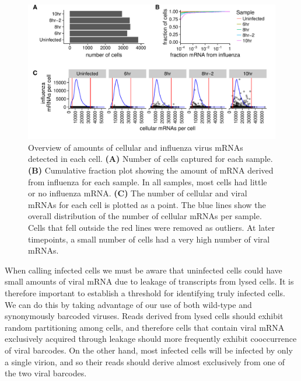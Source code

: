 \documentclass[9pt,lineno]{elife}
\begin{document}
\begin{figure}
\includegraphics[width=\linewidth]{figures/p_cell_mRNA_summary.pdf}
\caption{\label{fig:cells}
Overview of amounts of cellular and influenza virus mRNAs detected in each cell.
{\bf (A)} 
Number of cells captured for each sample.
{\bf (B)} 
Cumulative fraction plot showing the amount of mRNA derived from influenza for each sample.
In all samples, most cells had little or no influenza mRNA.
{\bf (C)} 
The number of cellular and viral mRNAs for each cell is plotted as a point.
The blue lines show the overall distribution of the number of cellular mRNAs per sample.
Cells that fell outside the red lines were removed as outliers.
At later timepoints, a small number of cells had a very high number of viral mRNAs.
}
\end{figure}

When calling infected cells we must be aware that uninfected cells could have small amounts of viral mRNA due to leakage of transcripts from lysed cells.
It is therefore important to establish a threshold for identifying truly infected cells.
We can do this by taking advantage of our use of both wild-type and synonymously barcoded viruses.
Reads derived from lysed cells should exhibit random partitioning among cells, and therefore cells that contain viral mRNA exclusively acquired  through leakage should more frequently exhibit cooccurrence of viral barcodes.
On the other hand, most infected cells will be infected by only a single virion, and so their reads should derive almost exclusively from one of the two viral barcodes. 
\end{document}

